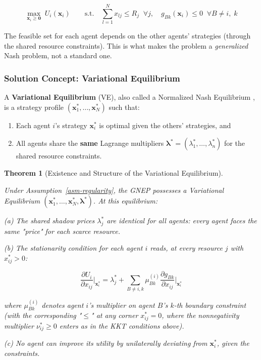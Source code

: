 \documentclass[11pt]{article}
\theoremstyle{plain}
\newtheorem{theorem}{Theorem}
\theoremstyle{definition}
\theoremstyle{remark}
\let\origsubsubsection\subsubsection
\renewcommand{\subsubsection}{\needspace{4\baselineskip}\origsubsubsection}
\providecommand{\tightlist}{%
  \setlength{\itemsep}{0pt}\setlength{\parskip}{0pt}}
\begin{document}
\[\max_{\mathbf{x}_i \geq \mathbf{0}} \; U_i(\mathbf{x}_i) \qquad \text{s.t.} \quad \sum_{l=1}^{N} x_{lj} \leq R_j \;\; \forall j, \quad g_{Bk}(\mathbf{x}_i) \leq 0 \;\; \forall B \neq i, \; k\]

The feasible set for each agent depends on the other agents' strategies
(through the shared resource constraints). This is what makes the
problem a \emph{generalized} Nash problem, not a standard one.

\subsubsection{Solution Concept: Variational
Equilibrium}\label{solution-concept-variational-equilibrium}

A \textbf{Variational Equilibrium} (VE), also called a Normalized Nash
Equilibrium \citep{Rosen1965}, is a strategy profile
\((\mathbf{x}_1^*, \ldots, \mathbf{x}_N^*)\) such that:

\begin{enumerate}
\def\labelenumi{\arabic{enumi}.}
\tightlist
\item
  Each agent \(i\)'s strategy \(\mathbf{x}_i^*\) is optimal given the
  others' strategies, and
\item
  All agents share the \textbf{same} Lagrange multipliers
  \(\boldsymbol{\lambda}^* = (\lambda_1^*, \ldots, \lambda_n^*)\) for
  the shared resource constraints.
\end{enumerate}

\begin{theorem}[Existence and Structure of the Variational Equilibrium]
\label{thm-variational-equilibrium}

Under Assumption~\ref{asm-regularity}, the GNEP possesses a Variational Equilibrium $(\mathbf{x}_1^*, \ldots, \mathbf{x}_N^*, \boldsymbol{\lambda}^*)$. At this equilibrium:

(a) The shared shadow prices $\lambda_j^*$ are identical for all agents: every agent faces the same "price" for each scarce resource.

(b) The stationarity condition for each agent $i$ reads, at every resource $j$ with $x_{ij}^* > 0$:

$$\frac{\partial U_i}{\partial x_{ij}}\bigg|_{\mathbf{x}_i^*} = \lambda_j^* + \sum_{B \neq i, k} \mu_{Bk}^{(i)} \frac{\partial g_{Bk}}{\partial x_{ij}}\bigg|_{\mathbf{x}_i^*}$$

where $\mu_{Bk}^{(i)}$ denotes agent $i$'s multiplier on agent $B$'s $k$-th boundary constraint (with the corresponding "$\leq$" at any corner $x_{ij}^* = 0$, where the nonnegativity multiplier $\nu_{ij}^* \geq 0$ enters as in the KKT conditions above).

(c) No agent can improve its utility by unilaterally deviating from $\mathbf{x}_i^*$, given the constraints.
\end{theorem}
\end{document}
